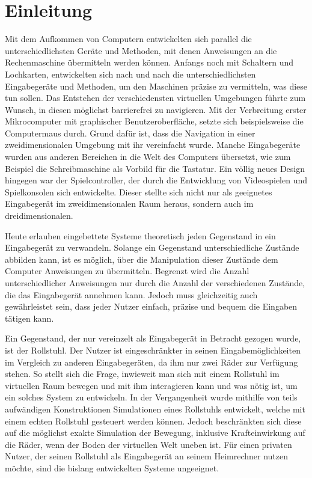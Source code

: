 \chapter{Einleitung}
Mit dem Aufkommen von Computern entwickelten sich parallel die unterschiedlichsten Geräte und Methoden, mit denen Anweisungen an die Rechenmaschine übermitteln werden können.
Anfangs noch mit Schaltern und Lochkarten, entwickelten sich nach und nach die unterschiedlichsten Eingabegeräte und Methoden, um den Maschinen präzise zu vermitteln, was diese tun sollen.
Das Entstehen der verschiedensten virtuellen Umgebungen führte zum Wunsch, in diesen möglichst barrierefrei zu navigieren.
Mit der Verbreitung erster Mikrocomputer mit graphischer Benutzeroberfläche, setzte sich beispielsweise die Computermaus durch.
Grund dafür ist, dass die Navigation in einer zweidimensionalen Umgebung mit ihr vereinfacht wurde.
Manche Eingabegeräte wurden aus anderen Bereichen in die Welt des Computers übersetzt, wie zum Beispiel die Schreibmaschine als Vorbild für die Tastatur.
Ein völlig neues Design hingegen war der Spielcontroller, der durch die Entwicklung von Videospielen und Spielkonsolen sich entwickelte.
Dieser stellte sich nicht nur als geeignetes Eingabegerät im zweidimensionalen Raum heraus, sondern auch im dreidimensionalen.

Heute erlauben eingebettete Systeme theoretisch jeden Gegenstand in ein Eingabegerät zu verwandeln.
Solange ein Gegenstand unterschiedliche Zustände abbilden kann, ist es möglich, über die Manipulation dieser Zustände dem Computer Anweisungen zu übermitteln.
Begrenzt wird die Anzahl unterschiedlicher Anweisungen nur durch die Anzahl der verschiedenen Zustände, die das Eingabegerät annehmen kann.
Jedoch muss gleichzeitig auch gewährleistet sein, dass jeder Nutzer einfach, präzise und bequem die Eingaben tätigen kann.

Ein Gegenstand, der nur vereinzelt als Eingabegerät in Betracht gezogen wurde, ist der Rollstuhl.
Der Nutzer ist eingeschränkter in seinen Eingabemöglichkeiten im Vergleich zu anderen Eingabegeräten, da ihm nur zwei Räder zur Verfügung stehen.
So stellt sich die Frage, inwieweit man sich mit einem Rollstuhl im virtuellen Raum bewegen und mit ihm interagieren kann und was nötig ist, um ein solches System zu entwickeln.
In der Vergangenheit wurde mithilfe von teils aufwändigen Konstruktionen Simulationen eines Rollstuhls entwickelt, welche mit einem echten Rollstuhl gesteuert werden können.
Jedoch beschränkten sich diese auf die möglichst exakte Simulation der Bewegung, inklusive Krafteinwirkung auf die Räder, wenn der Boden der virtuellen Welt uneben ist.
Für einen privaten Nutzer, der seinen Rollstuhl als Eingabegerät an seinem Heimrechner nutzen möchte, sind die bislang entwickelten Systeme ungeeignet.

